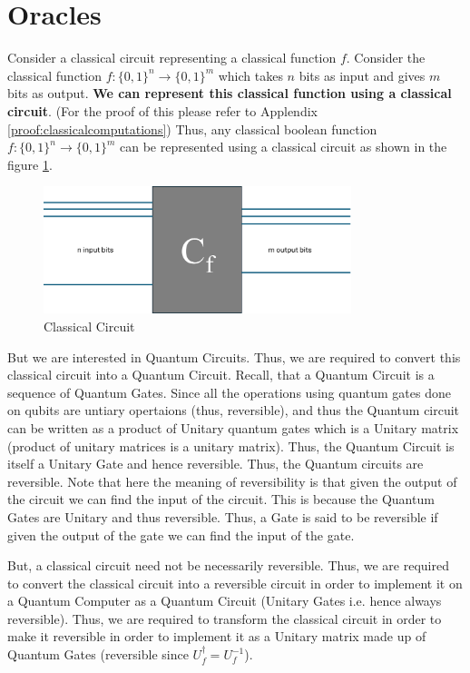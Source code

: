 \documentclass[12pt, oneside]{book}
\theoremstyle{definition}
\theoremstyle{definition}
\theoremstyle{remark}
\begin{document}
\section{Oracles}\label{sec:Oracles}
Consider a classical circuit representing a classical function $f$. 
Consider the classical function $f:\{0,1\}^n \rightarrow \{0,1\}^m$ which takes $n$ bits as input and gives $m$ bits as output.
\textbf{We can represent this classical function using a classical circuit}. (For the proof of this please refer to Applendix \ref{proof:classicalcomputations})
Thus, any classical boolean function $f:\{0,1\}^n \rightarrow \{0,1\}^m$ can be represented using a classical circuit as shown in the figure \ref{classicalcircuit}.
\begin{figure}[H]
    \centering
    \includegraphics[width=0.8\textwidth]{../images/classicalcircuit.png}
    \caption{Classical Circuit}
    \label{classicalcircuit}
\end{figure}
But we are interested in Quantum Circuits. Thus, we are required to convert this classical circuit into a Quantum Circuit.
Recall, that a Quantum Circuit is a sequence of Quantum Gates. Since all the operations using quantum gates done on qubits  are untiary opertaions (thus, reversible),
and thus the Quantum circuit can be written as a product of Unitary quantum gates which is a Unitary matrix (product of unitary matrices is a unitary matrix). Thus, the Quantum Circuit is itself a Unitary Gate and hence reversible. Thus, the Quantum circuits are reversible.
Note that here the meaning of reversibility is that given the output of the circuit we can find the input of the circuit. This is because the Quantum Gates are Unitary and thus reversible.
Thus, a Gate is said to be reversible if given the output of the gate we can find the input of the gate. 

But, a classical circuit need not be necessarily reversible. Thus, we are required to convert the classical circuit into a reversible circuit in order to implement it on a Quantum Computer as a Quantum Circuit (Unitary Gates i.e. hence always reversible).
Thus, we are required to transform the classical circuit in order to make it reversible in order to implement it as a Unitary matrix made up of Quantum Gates (reversible since $U_f^{\dagger}=U_f^{-1}$).
\end{document}

